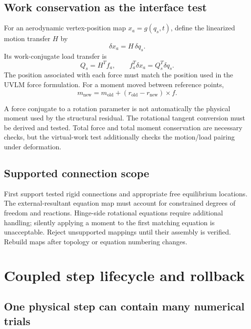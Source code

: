\documentclass[11pt,a4paper]{article}
\begin{document}
\subsection{Work conservation as the interface test}

For an aerodynamic vertex-position map $x_a=g(q_s,t)$, define the linearized
motion transfer $H$ by
\begin{equation}
 \delta x_a=H\,\delta q_s.
\end{equation}
Its work-conjugate load transfer is
\begin{equation}
 Q_s=H^T f_a,\qquad f_a^T\delta x_a=Q_s^T\delta q_s.
\end{equation}
The position associated with each force must match the position used in the
UVLM force formulation. For a moment moved between reference points,
\begin{equation}
 m_{\mathrm{new}}=m_{\mathrm{old}}+
 (r_{\mathrm{old}}-r_{\mathrm{new}})\times f.
\end{equation}

A force conjugate to a rotation parameter is not automatically the physical
moment used by the structural residual. The rotational tangent conversion
must be derived and tested. Total force and total moment conservation are
necessary checks, but the virtual-work test additionally checks the motion/load
pairing under deformation.

\subsection{Supported connection scope}

First support tested rigid connections and appropriate free equilibrium
locations. The external-resultant equation map must account for constrained
degrees of freedom and reactions. Hinge-side rotational equations require
additional handling; silently applying a moment to the first matching equation
is unacceptable. Reject unsupported mappings until their assembly is verified.
Rebuild maps after topology or equation numbering changes.

\section{Coupled step lifecycle and rollback}
\label{sec:lifecycle}

\subsection{One physical step can contain many numerical trials}
\end{document}
